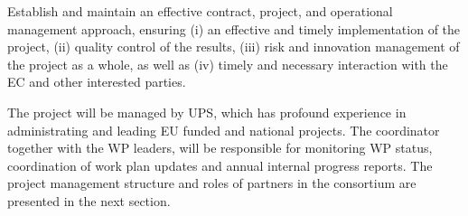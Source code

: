 \begin{workpackage}[id=management,type=MGT,wphases=0-48!.2,swsites,
  title=Project Management,short=Management,
  lead=PS,
  PSRM=28,SARM=2,  
  USORM=2,LLRM=2,UVRM=2,UJFRM=2,UBRM=2,UORM=2, USHRM=2,
  UWRM=2, JURM=2, UKRM=2, USRM=2, ZHRM=1, SRRM=2, UWSRM=2]

\begin{wpobjectives}

Establish and maintain an effective contract, project, and operational management
approach, ensuring (i) an effective and timely implementation of the project, (ii) quality control
of the results, (iii) risk and innovation management of the project as a whole, as well as (iv)
timely and necessary interaction with the EC and other interested parties.

\end{wpobjectives}

\begin{wpdescription}
The project will be managed by UPS, which has profound experience in administrating and leading EU funded and national projects. The coordinator together with the WP leaders, will be responsible for monitoring WP status, coordination of work plan updates and annual internal progress reports. The project management structure  and roles of partners in the consortium are presented in the next section.
\end{wpdescription}


\end{workpackage}
